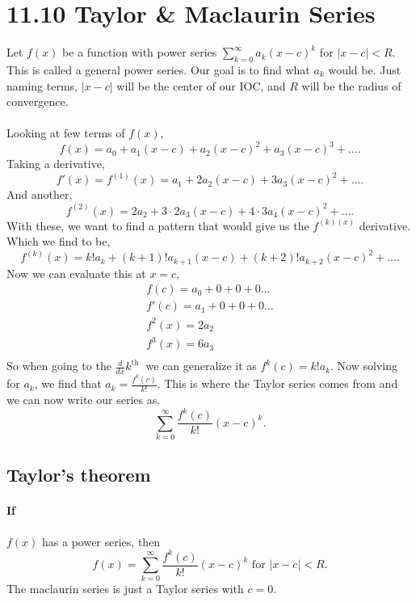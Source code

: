 \section{11.10 Taylor \& Maclaurin Series}%
Let $ f\left( x \right)  $ be a function with power series $ \sum_{ k=0 } ^{ \infty } a_k\left( x-c \right) ^{ k } $ for $ \left| x-c \right|<R $. This is called a general power series. Our goal is to find what $ a_k $ would be. Just naming terms, $ \left| x-c \right| $ will be the center of our IOC, and $ R $ will be the radius of convergence. \\ \\

Looking at few terms of $ f\left( x \right)  $,
\[
f\left( x \right) =a_0 + a_1\left( x-c \right) + a_2\left( x-c \right) ^{ 2 } + a_3\left( x-c \right) ^{ 3 } + \ldots
.\] 
Taking a derivative,
\[
f'\left( x \right) = f^{ \left( 1 \right)  }\left( x \right) = a_1 + 2a_2\left( x-c \right) + 3a_3\left( x-c \right) ^{ 2 } + \ldots
.\] 
And another,
\[
f^{ \left( 2 \right)  }\left( x \right) = 2a_2 + 3\cdot 2a_3\left( x-c \right) + 4\cdot 3a_4\left( x-c \right) ^{ 2 } + \ldots
.\] 
With these, we want to find a pattern that would give us the $ f^{ \left( k \right) \left( x \right)  } $ derivative. Which we find to be,
\[
f^{ \left( k \right)  }\left( x \right) = k!a_k + \left( k+1 \right)! a_{ k+1 }\left( x-c \right) + \left( k+2 \right) ! a_{ k+2 }\left( x-c \right) ^2 + \ldots
.\] 
Now we can evaluate this at $ x=c $,
\begin{gather*}
f\left( c \right) =a_0 + 0 + 0 + 0\ldots \\
f'\left( c \right) = a_1 + 0 + 0 + 0 \ldots \\
f^{ 2 }\left( x \right) = 2a_2 \\
f^{ 3 }\left( x \right) = 6a_3 \\
\end{gather*}
So when going to the $ \frac{ d }{ dx } k^{ \text{th } } $ we can generalize it as $ f^{ k }\left( c \right) = k!a_k $. Now solving for $ a_k $, we find that $ a_k=\frac{ f^{ k }\left( c \right)  }{ k! } $. This is where the Taylor series comes from and we can now write our series as.
\[
\sum_{ k=0 } ^{ \infty } \frac{ f^{ k }\left( c \right)  }{ k! }\left( x-c \right) ^{ k }
.\] 
\subsection*{Taylor's theorem}%
\label{sub:Taylor's theorem}
\paragraph{If} $ f\left( x \right)  $ has a power series, then 
\[
f\left( x \right)=\sum_{ k=0 } ^{ \infty } \frac{ f^{ k }\left( c \right)  }{ k! }\left( x-c \right) ^{ k } \text{ for } \left| x-c \right|<R
.\] 
The maclaurin series is just a Taylor series with $ c=0 $. \\ \\

